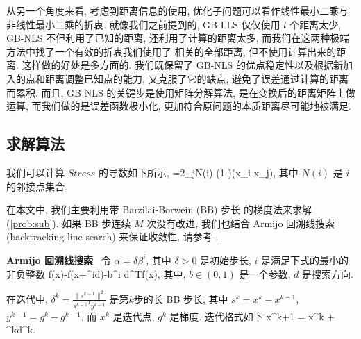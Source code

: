 \documentclass{CASthesis_zzk}
\begin{document}
从另一个角度来看, 考虑到距离信息的使用,
优化子问题可以看作线性最小二乘与非线性最小二乘的折衷.
就像我们之前提到的, GB-LLS 仅仅使用 $l$ 个距离\pozhe 太少,
GB-NLS 不但利用了已知的距离, 还利用了计算的距离\pozhe 太多, 
而我们在这两种极端方法中找了一个有效的折衷\pozhe 我们使用了
相关的全部距离, 但不使用计算出来的距离.
这样做的好处是多方面的.
我们既保留了 GB-NLS 的优点\pozhe 稳定性以及根据新加入的点和距离调整已知点的能力,
又克服了它的缺点, 避免了误差通过计算的距离而累积.
而且, GB-NLS 的关键步是使用矩阵分解算法,
是在变换后的距离矩阵上做运算,
而我们做的是误差函数极小化, 
更加符合原问题的本质\pozhe 距离尽可能地被满足.

\subsection{求解算法}
\label{sec:OptSolution}
我们可以计算 $Stress$ 的导数如下所示,
\be {}=2\sum_{j\in N(i)} \Big(1-\Big)(x_i-x_j), \label{gradient}\ee
其中 $N(i)$ 是 $i$ 的邻接点集合.

在本文中, 我们主要利用带 Barzilai-Borwein (BB) 步长 \cite{BB1988} 
的梯度法来求解 (\ref{prob:sub}). 
如果 BB 步连续 $M$ 次没有改进, 
我们也结合 Armijo 回溯线搜索 (backtracking line search) 来保证收敛性,
请参考 \cite{Armijo1966,Sun2006}.

\textbf{Armijo 回溯线搜索} ~令 $\alpha = \delta\beta^i$, 
其中 $\delta>0$ 是初始步长, 
$i$ 是满足下式的最小的非负整数
\be f(x)-f(x+\delta\beta^id)\geq -b\delta\beta^i d^T\nabla f(x), \ee
其中, $b\in (0,1)$ 是一个参数, $d$ 是搜索方向.

在迭代中, 
$\delta^k=\frac{\|s^{k-1}\|^2}{{s^{k-1}}^Ty^{k-1}}$ 是第$k$步的长 BB 步长, 
其中 $s^k=x^k-x^{k-1}$, $y^{k-1}=g^k-g^{k-1}$, 而 $x^k$ 是迭代点,
$g^k$ 是梯度. 
迭代格式如下
\be x^{k+1} = x^k + \alpha^kd^k.\ee

\end{document}
